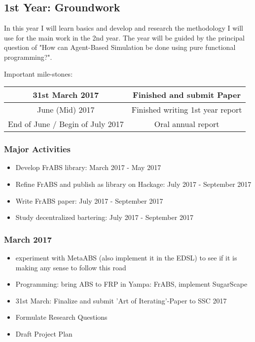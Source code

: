 \subsection{1st Year: Groundwork}
In this year I will learn basics and develop and research the methodology I will use for the main work in the 2nd year. The year will be guided by the principal question of "How can Agent-Based Simulation be done using pure functional programming?".

Important mile-stones:

\begin{center}
\begin{tabular}{ c|c } 
	31st March 2017 & Finished and submit Paper \\ 
	\hline
	June (Mid) 2017 & Finished writing 1st year report  \\ 
	\hline
	End of June / Begin of July 2017 & Oral annual report \\
\end{tabular}
\end{center}

\subsubsection{Major Activities}
\begin{itemize}
	\item Develop FrABS library: March 2017 - May 2017
	\item Refine FrABS and publish as library on Hackage: July 2017 - September 2017
	\item Write FrABS paper: July 2017 - September 2017
	\item Study decentralized bartering: July 2017 - September 2017
\end{itemize}


\subsubsection{March 2017}
\begin{itemize}
	\item experiment with MetaABS (also implement it in the EDSL) to see if it is making any sense to follow this road
	\item Programming: bring ABS to FRP in Yampa: FrABS, implement SugarScape
	\item 31st March: Finalize and submit 'Art of Iterating'-Paper to SSC 2017 
	\item Formulate Research Questions
	\item Draft Project Plan
\end{itemize}

